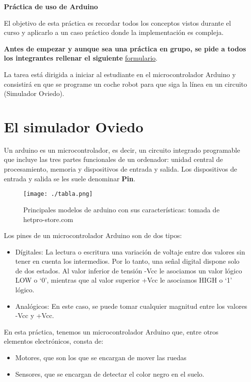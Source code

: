 \documentclass{article}
\begin{document}
\shorthandoff{>}\shorthandoff{<}

\vspace{5mm}\centerline{\large\bf Práctica de uso de Arduino}\vspace{5mm}
\label{sec:orgbb05154}

El objetivo de esta práctica es recordar todos los conceptos vistos durante el curso y aplicarlo a un caso práctico donde la implementación es compleja.

\textbf{Antes de empezar y aunque sea una práctica en grupo, se pide a todos los integrantes rellenar el siguiente} \href{https://forms.gle/pS8vjtNx2hcGZ7MD9}{formulario}.

La tarea está dirigida a iniciar al
estudiante en el microcontrolador Arduino y consistirá
en que se programe un coche robot para que siga la línea en un circuito (Simulador Oviedo).

\section*{El simulador Oviedo}
Un arduino es un microcontrolador, es decir, un circuito integrado
programable que incluye las tres partes funcionales de un ordenador:
unidad central de procesamiento, memoria y dispositivos de entrada y
salida. Los dispositivos de entrada y salida se les suele denominar \textbf{Pin}.

\begin{figure}[htbp]
\centering
\texttt{[image: ./tabla.png]}
\caption{Principales modelos de arduino con sus características: tomada de hetpro-store.com}
\end{figure}

Los pines de un microcontrolador Arduino son de dos
tipos: 
\begin{itemize}
\item Dígitales: La lectura o escritura  una variación  de  voltaje  entre
dos valores  sin  tener en cuenta los intermedios. Por lo
tanto, una señal digital dispone solo de dos estados. Al valor
inferior  de  tensión -Vcc le asociamos un valor lógico LOW o ‘0’,
mientras que al valor superior +Vcc le asociamos HIGH o ‘1’ lógico.
\item Analógicos: En este caso, se puede tomar cualquier magnitud entre
los valores -Vcc y +Vcc.
\end{itemize}



En esta práctica, tenemos un microcontrolador Arduino que, entre otros
elementos electrónicos, consta de: 
\begin{itemize}
\item Motores, que son los que se encargan de mover las ruedas
\item Sensores, que se encargan de detectar el color negro en el suelo.
\end{itemize}
\end{document}
